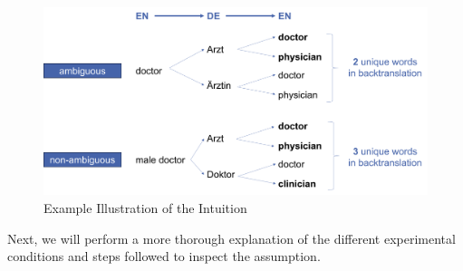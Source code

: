 \begin{figure}
  \centering
  \includegraphics[scale=0.45]{figures/intuition.png}
  \caption{Example Illustration of the Intuition}
  \label{fig:intuition}
\end{figure}

Next, we will perform a more thorough explanation of the different experimental conditions and steps followed to inspect the assumption.



